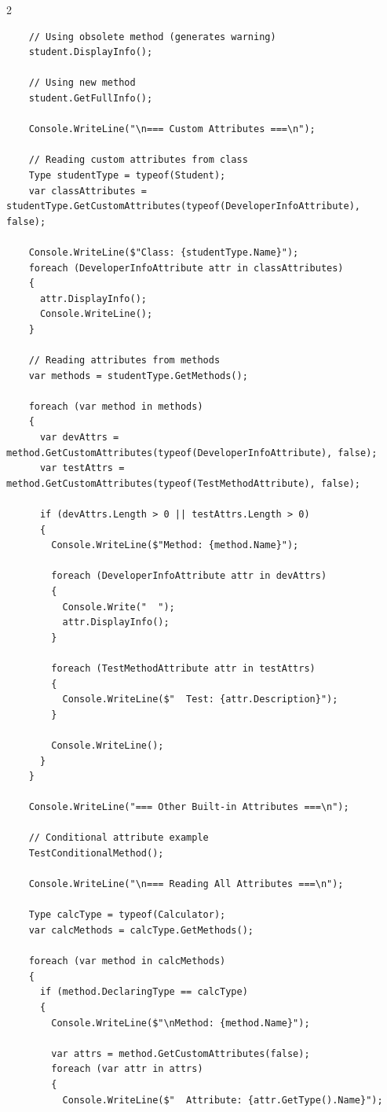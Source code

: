 \documentclass[10pt,a4paper]{article}
\begin{document}
\begin{multicols}{2}
\begin{lstlisting}
    // Using obsolete method (generates warning)
    student.DisplayInfo();
    
    // Using new method
    student.GetFullInfo();
    
    Console.WriteLine("\n=== Custom Attributes ===\n");
    
    // Reading custom attributes from class
    Type studentType = typeof(Student);
    var classAttributes = studentType.GetCustomAttributes(typeof(DeveloperInfoAttribute), false);
    
    Console.WriteLine($"Class: {studentType.Name}");
    foreach (DeveloperInfoAttribute attr in classAttributes)
    {
      attr.DisplayInfo();
      Console.WriteLine();
    }
    
    // Reading attributes from methods
    var methods = studentType.GetMethods();
    
    foreach (var method in methods)
    {
      var devAttrs = method.GetCustomAttributes(typeof(DeveloperInfoAttribute), false);
      var testAttrs = method.GetCustomAttributes(typeof(TestMethodAttribute), false);
      
      if (devAttrs.Length > 0 || testAttrs.Length > 0)
      {
        Console.WriteLine($"Method: {method.Name}");
        
        foreach (DeveloperInfoAttribute attr in devAttrs)
        {
          Console.Write("  ");
          attr.DisplayInfo();
        }
        
        foreach (TestMethodAttribute attr in testAttrs)
        {
          Console.WriteLine($"  Test: {attr.Description}");
        }
        
        Console.WriteLine();
      }
    }
    
    Console.WriteLine("=== Other Built-in Attributes ===\n");
    
    // Conditional attribute example
    TestConditionalMethod();
    
    Console.WriteLine("\n=== Reading All Attributes ===\n");
    
    Type calcType = typeof(Calculator);
    var calcMethods = calcType.GetMethods();
    
    foreach (var method in calcMethods)
    {
      if (method.DeclaringType == calcType)
      {
        Console.WriteLine($"\nMethod: {method.Name}");
        
        var attrs = method.GetCustomAttributes(false);
        foreach (var attr in attrs)
        {
          Console.WriteLine($"  Attribute: {attr.GetType().Name}");
          

\end{lstlisting}
\end{multicols}
\end{document}
